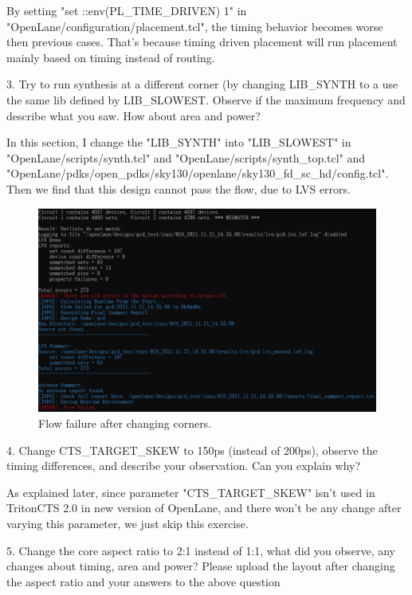 \documentclass[a4paper]{article}
\begin{document}
By setting "set ::env(PL\_TIME\_DRIVEN) 1" in \\ "OpenLane/configuration/placement.tcl", the timing behavior becomes worse then previous cases. That's because timing driven placement will run placement mainly based on timing instead of routing.

3. Try to run synthesis at a different corner (by changing LIB\_SYNTH to a use the same lib defined by LIB\_SLOWEST. Observe if the maximum frequency and describe what you saw. How about area and power?

In this section, I change the "LIB\_SYNTH" into "LIB\_SLOWEST" in "OpenLane/scripts/synth.tcl" and "OpenLane/scripts/synth\_top.tcl"  and "OpenLane/pdks/open\_pdks/sky130/openlane/sky130\_fd\_sc\_hd/config.tcl". Then we find that this design cannot pass the flow, due to LVS errors. 
\begin{figure}[H]
    \centering
    \includegraphics[width=1\textwidth]{exercise_2_3_1.png}
    \caption{Flow failure after changing corners.}
\end{figure}

4. Change CTS\_TARGET\_SKEW to 150ps (instead of 200ps), observe the timing differences, and describe your observation. Can you explain why?

As explained later, since parameter "CTS\_TARGET\_SKEW" isn't used in TritonCTS 2.0 in new version of OpenLane, and there won't be any change after varying this parameter, we just skip this exercise.

5. Change the core aspect ratio to 2:1 instead of 1:1, what did you observe, any changes about timing, area and power? Please upload the layout after changing the aspect ratio and your answers to the above question
\end{document}
